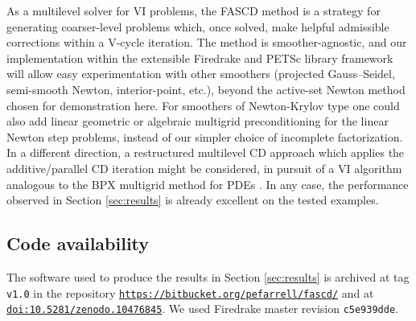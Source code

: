 \documentclass[review,hidelinks,onefignum,onetabnum,final]{siamart220329}  %
\begin{document}
As a multilevel solver for VI problems, the FASCD method is a strategy for generating coarser-level problems which, once solved, make helpful admissible corrections within a V-cycle iteration.  The method is smoother-agnostic, and our implementation within the extensible Firedrake \cite{Rathgeberetal2016} and PETSc \cite{Balayetal2023} library framework will allow easy experimentation with other smoothers (projected Gauss--Seidel, semi-smooth Newton, interior-point, etc.), beyond the active-set Newton method chosen for demonstration here.  For smoothers of Newton-Krylov type one could also add linear geometric or algebraic multigrid preconditioning \cite{Trottenbergetal2001} for the linear Newton step problems, instead of our simpler choice of incomplete factorization.  In a different direction, a restructured multilevel CD approach which applies the additive/parallel CD iteration \cite{Tai2003} might be considered, in pursuit of a VI algorithm analogous to the BPX multigrid method for PDEs \cite{BramblePasciakXu1990}.  In any case, the performance observed in Section \ref{sec:results} is already excellent on the tested examples.


\subsection*{Code availability} \label{sec:code}  The software used to produce the results in Section \ref{sec:results} is archived at tag \texttt{v1.0} in the repository \texttt{\url{https://bitbucket.org/pefarrell/fascd/}} and at \href{https://doi.org/10.5281/zenodo.10476845}{\texttt{doi:10.5281/zenodo.10476845}}.  We used Firedrake master revision \texttt{c5e939dde}.




\end{document}
